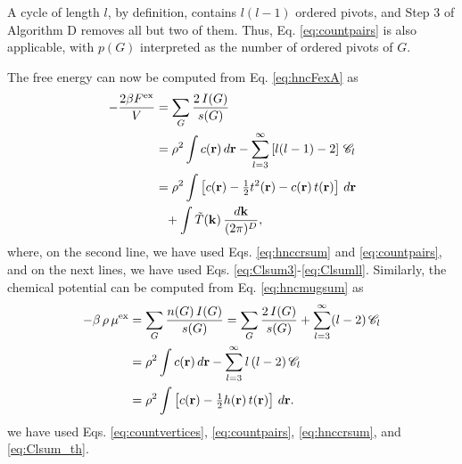 \documentclass[preprint]{revtex4-1}
\newcommand{\vct}[1]{\mathbf{#1}}
\providecommand{\vr}{} %
\renewcommand{\vr}{\vct{r}}
\newcommand{\vk}{\vct{k}}
\newcommand{\dvk}{\frac{d\vk}{(2\pi)^D}}
\newcommand{\supex}[1]{ { { #1 }^{ \mathrm{ex} } } }
\newcommand{\Fex}{\supex{F}}
\newcommand{\muex}{\supex{\mu}}
\newcommand{\Chn}{\mathscr{C}}
\newcommand{\A}{\mathcal{A}}
\begin{document}
A cycle of length $l$, by definition,
  contains $l (l - 1)$ ordered pivots,
  and Step 3 of Algorithm D
  removes all but two of them.
%
Thus, Eq. \eqref{eq:countpairs}
  is also applicable, with $p(G)$ interpreted
  as the number of ordered pivots of $G$.



The free energy can now be computed from Eq. \eqref{eq:hncFexA}
as\cite{morita1958, *morita1960, *morita1960I, singer1985}
%
\begin{align}
    - \frac{ 2 \beta \Fex } { V }
  &=
      \sum_G \frac{ 2 \, I(G) } { s(G) }
      \notag \\
  &=
      \rho^2 \int c(\vr) \, d\vr
    - \sum_{l = 3}^\infty \left[ l(l-1) - 2 \right] \, \Chn_l
      \notag \\
  &=
      \rho^2 \int \left[ c(\vr) - \tfrac{1}{2} t^2(\vr) - c(\vr) \, t(\vr) \right] \, d\vr
      \notag \\
  & \hphantom{=}
      + \int  \tilde{T}(\vk) \, \dvk,
\label{eq:hncF}
\end{align}
%
where,
  on the second line,
  we have used Eqs. \eqref{eq:hnccrsum} and \eqref{eq:countpairs},
  and on the next lines,
  we have used Eqs. \eqref{eq:Clsum3}-\eqref{eq:Clsumll}.
%
Similarly, the chemical potential
  can be computed from Eq. \eqref{eq:hncmugsum}
  as \cite{morita1958, *morita1960, *morita1960I, singer1985}
%
\begin{align}
    - \beta \, \rho \, \muex
  &=
      \sum_G \frac{ n(G) \, I(G) } { s(G) }
  =
      \sum_G \frac{ 2 \, I(G) } { s(G) }
    + \sum_{l = 3}^\infty (l-2) \, \Chn_l
      \notag \\
  &=
      \rho^2 \int c(\vr) \, d\vr
    - \sum_{l = 3}^\infty l \, (l-2) \, \Chn_l
      \notag \\
  &=
      \rho^2 \int \left[ c(\vr) - \tfrac{1}{2} h(\vr) \, t(\vr) \right] \, d\vr.
\label{eq:hncmu}
\end{align}
%
we have used Eqs. \eqref{eq:countvertices}, \eqref{eq:countpairs},
\eqref{eq:hnccrsum}, and \eqref{eq:Clsum_th}.
\end{document}
